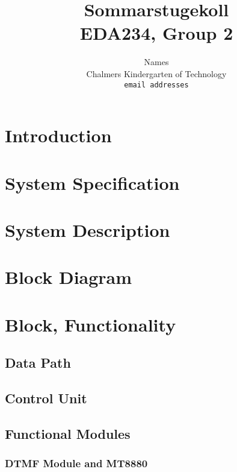 \documentclass[a4paper,11pt]{article}
\begin{document}
\title{Sommarstugekoll \\
	EDA234, Group 2}
\author{Names \\
   Chalmers Kindergarten of Technology \\
   \texttt{email addresses}}

\maketitle

\begin{abstract}
\end{abstract}

\pagebreak

\tableofcontents

\section{Introduction}

\section{System Specification}

\section{System Description}

\section{Block Diagram}

\section{Block, Functionality}

	\subsection{Data Path}

	\subsection{Control Unit}

	\subsection{Functional Modules}

		\subsubsection{DTMF Module and MT8880}
	
\end{document}
